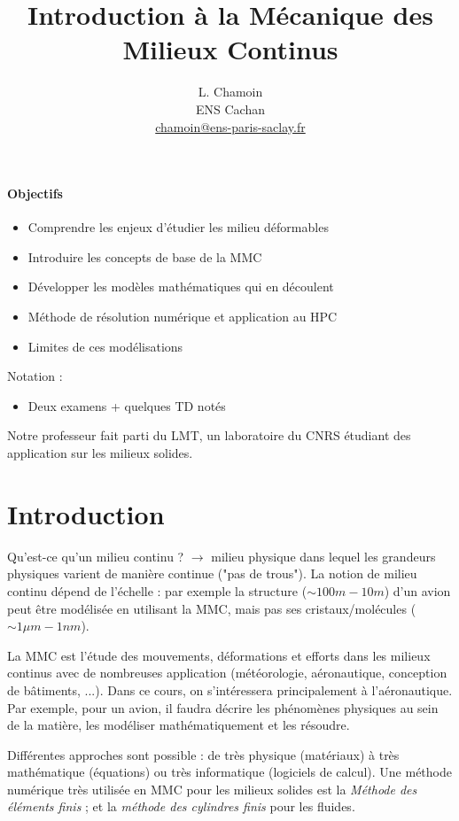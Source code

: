\documentclass{article}
\title{Introduction à la Mécanique des Milieux Continus}
\author{L. Chamoin\\
ENS Cachan\\
\url{chamoin@ens-paris-saclay.fr}}
\date{}
\begin{document}
\maketitle
\tableofcontents
\newpage

\paragraph{Objectifs}
\begin{itemize}
\item Comprendre les enjeux d'étudier les milieu déformables
\item Introduire les concepts de base de la MMC
\item Développer les modèles mathématiques qui en découlent
\item Méthode de résolution numérique et application au HPC
\item Limites de ces modélisations
\end{itemize}
\bigskip

Notation :
\begin{itemize}
\item Deux examens + quelques TD notés
\end{itemize}

Notre professeur fait parti du LMT, un laboratoire du CNRS étudiant des application sur les milieux solides.

\section{Introduction}
Qu'est-ce qu'un milieu continu ? $\to$ milieu physique dans lequel les grandeurs physiques varient de manière continue ("pas de trous"). La notion de milieu continu dépend de l'échelle : par exemple la structure ($\sim 100m-10m$) d'un avion peut être modélisée en utilisant la MMC, mais pas ses cristaux/molécules ($\sim 1 \mu m-1nm$).
\bigskip

La MMC est l'étude des mouvements, déformations et efforts dans les milieux continus avec de nombreuses application (météorologie, aéronautique, conception de bâtiments, ...). Dans ce cours, on s'intéressera principalement à l'aéronautique. Par exemple, pour un avion, il faudra décrire les phénomènes physiques au sein de la matière, les modéliser mathématiquement et les résoudre.

Différentes approches sont possible : de très physique (matériaux) à très mathématique (équations) ou très informatique (logiciels de calcul). Une méthode numérique très utilisée en MMC pour les milieux solides est la \emph{Méthode des éléments finis} ; et la \emph{méthode des cylindres finis} pour les fluides.
\end{document}
